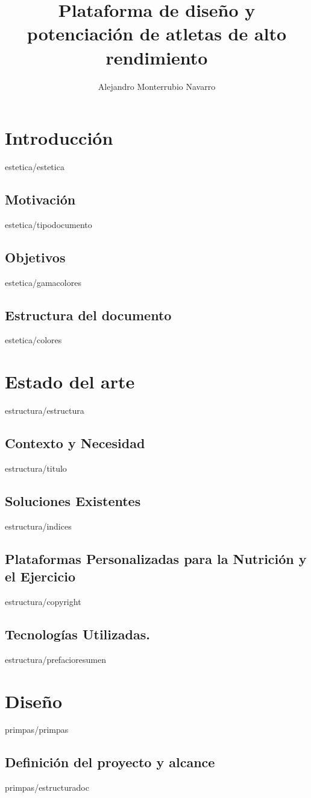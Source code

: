 \documentclass[epsbased,copyright,final,printable,covers,extendedindex,firstnumbered,tfg,gnuplot]{tfgtfmthesisuam}
\title{Plataforma de diseño y potenciación de atletas de alto rendimiento}
\author{Alejandro Monterrubio Navarro}
\begin{document}
\chapter{Introducción\label{CAP:ESTETICA}}{estetica/estetica}
  \section{Motivación\label{SEC:TIPODOC}}{estetica/tipodocumento}
  \section{Objetivos\label{SEC:GAMASEL}}{estetica/gamacolores}
  \section{Estructura del documento\label{SEC:COLORES}}{estetica/colores}

\chapter{Estado del arte\label{CAP:ESTRUCTURA}}{estructura/estructura}
  \section{Contexto y Necesidad\label{SEC:VARIABLES}}{estructura/titulo}
  \section{Soluciones Existentes\label{SEC:INDICES}}{estructura/indices}
  \section{Plataformas Personalizadas para la Nutrición y el Ejercicio\label{SEC:COPYRIGHT}}{estructura/copyright}
  \section{Tecnologías Utilizadas.\label{SEC:PREFACIO}}{estructura/prefacioresumen}

\chapter{Diseño\label{CAP:PRIMEROSPASOS}}{primpas/primpas}
  \section{Definición del proyecto y alcance\label{SEC:ESTRUCTURAR}}{primpas/estructuradoc}
\end{document}
